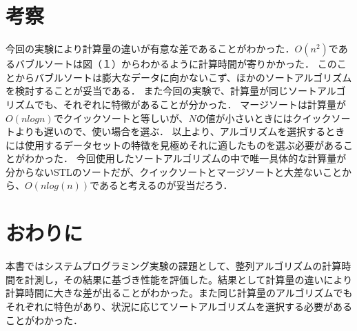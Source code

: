\documentclass[fleqn, a4paper. 12pt]{ltjsarticle} %
\begin{document}
  \section{考察}
  今回の実験により計算量の違いが有意な差であることがわかった．$O(n^2)$であるバブルソートは図（１）からわかるように計算時間が寄りかかった．
  このことからバブルソートは膨大なデータに向かないこず、ほかのソートアルゴリズムを検討することが妥当である．
  また今回の実験で、計算量が同じソートアルゴリズムでも、それぞれに特徴があることが分かった．
  マージソートは計算量が$O(nlogn)$でクイックソートと等しいが、$N$の値が小さいときにはクイックソートよりも遅いので、使い場合を選ぶ．
  以上より、アルゴリズムを選択するときには使用するデータセットの特徴を見極めそれに適したものを選ぶ必要があることがわかった．
  今回使用したソートアルゴリズムの中で唯一具体的な計算量が分からないSTLのソートだが、クイックソートとマージソートと大差ないことから、$O(nlog(n))$であると考えるのが妥当だろう．

  \section{おわりに}
    本書ではシステムプログラミング実験の課題として、整列アルゴリズムの計算時間を計測し，その結果に基づき性能を評価した。結果として計算量の違いにより計算時間に大きな差が出ることがわかった。また同じ計算量のアルゴリズムでもそれぞれに特色があり、状況に応じてソートアルゴリズムを選択する必要があることがわかった．
\end{document}
